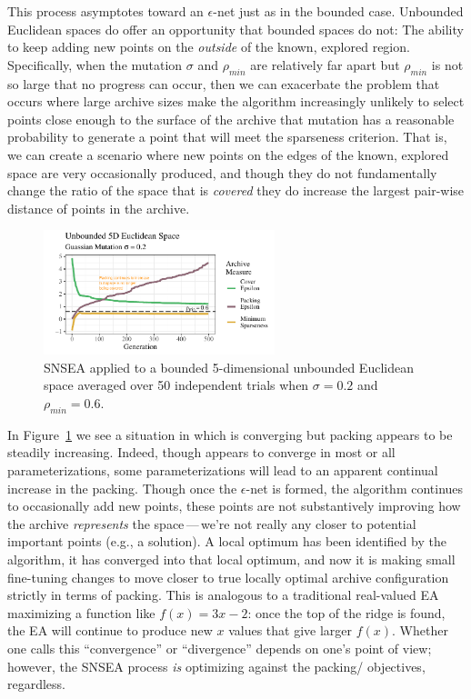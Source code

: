 \documentclass[twoside]{article}
\begin{document}
This process asymptotes toward an $\epsilon$-net just as in the bounded case.  Unbounded Euclidean spaces do offer an opportunity that bounded spaces do not:  The ability to keep adding new points on the \emph{outside} of the known, explored region.  Specifically, when the mutation $\sigma$ and $\rho_{min}$ are relatively far apart but $\rho_{min}$ is not so large that no progress can occur, then we can exacerbate the problem that occurs where large archive sizes make the algorithm increasingly unlikely to select points close enough to the surface of the archive that mutation has a reasonable probability to generate a point that will meet the sparseness criterion.  That is, we can create a scenario where new points on the edges of the known, explored space are very occasionally produced, and though they do not fundamentally change the ratio of the space that is \emph{covered} they do increase the largest pair-wise distance of points in the archive.
%
\begin{figure}[h]
  \center\includegraphics[width=0.6\textwidth]{Figures/unbounded-s02-r06-NOPOP.pdf}
  \caption{\label{fig:unbounded:nopop:0206} SNSEA applied to a bounded 5-dimensional unbounded Euclidean space averaged over 50 independent trials when $\sigma=0.2$ and $\rho_{min}=0.6$.}
\end{figure}

In Figure~\ref{fig:unbounded:nopop:0206} we see a situation in which  is converging but packing appears to be steadily increasing.  Indeed, though  appears to converge in most or all parameterizations, some parameterizations will lead to an apparent continual increase in the packing.  Though once the $\epsilon$-net is formed, the algorithm continues to occasionally add new points, these points are not substantively improving how the archive \emph{represents} the space\,---\,we're not really any closer to potential important points (e.g., a solution).  A local optimum has been identified by the algorithm, it has converged into that local optimum, and now it is making small fine-tuning changes to move closer to true locally optimal archive configuration strictly in terms of packing. This is analogous to a traditional real-valued EA maximizing a function like $f(x)=3x - 2$: once the top of the ridge is found, the EA will continue to produce new $x$ values that give larger $f(x)$.  Whether one calls this ``convergence'' or ``divergence'' depends on one's point of view; however, the SNSEA process \emph{is} optimizing against the packing/ objectives, regardless.
\end{document}
